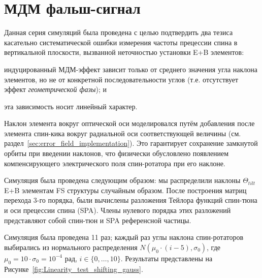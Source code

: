 \section{МДМ фальш-сигнал} \label{sec:simulation-fake_signal}
Данная серия симуляций была проведена с целью подтвердить два тезиса
касательно систематической ошибки измерения частоты прецессии спина в
вертикальной плоскости, вызванной неточностью установки E+B элементов:
\begin{enumerate*}[1)]
	\item индуцированный МДМ-эффект зависит только от среднего значения
	угла наклона элементов, но не от  конкретной последовательности
	углов (т.е. отсутствует эффект \emph{геометрической фазы}); и
	\item эта зависимость носит линейный характер.
\end{enumerate*}

Наклон элемента вокруг оптической оси моделировался путём добавления
после элемента спин-кика вокруг радиальной оси соответствующей
величины (см. раздел~\ref{sec:error_field_implementation}). Это
гарантирует сохранение замкнутой орбиты при введении наклонов, что
физически обусловлено появлением компенсирующего электрического поля 
спин-ротатора при его наклоне.

Симуляция была проведена следующим образом: мы распределили наклоны
$\Theta_{tilt}$ E+B элементам FS структуры случайным образом. После
построения матриц перехода 3-го порядка, были вычислены разложения
Тейлора функций спин-тюна и оси прецессии спина (SPA). Члены нулевого
порядка этих разложений представляют собой спин-тюн и SPA референсной частицы.

Симуляция была проведена 11 раз; каждый раз углы наклона
спин-ротаторов выбирались из нормального распределения
$N(\mu_0\cdot(i-5), \sigma_0)$, где $\mu_0 = 10\cdot \sigma_0 =
10^{-4}$ рад, $i\in\lbrace0,\dots, 10\rbrace$. Результаты представлены
на Рисунке~\ref{fig:Linearity_test_shifting_gauss}.


